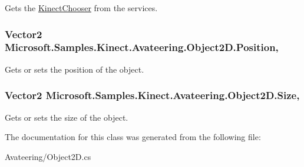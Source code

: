 Gets the \hyperlink{class_microsoft_1_1_samples_1_1_kinect_1_1_avateering_1_1_kinect_chooser}{Kinect\+Chooser} from the services. 

\hypertarget{class_microsoft_1_1_samples_1_1_kinect_1_1_avateering_1_1_object2_d_a2ed3063bbd65e30889fda66d44eaec68}{
\subsubsection[{Position}]{\setlength{\rightskip}{0pt plus 5cm}Vector2 Microsoft.\+Samples.\+Kinect.\+Avateering.\+Object2\+D.\+Position\hspace{0.3cm}{\ttfamily [get]}, {\ttfamily [set]}}}\label{class_microsoft_1_1_samples_1_1_kinect_1_1_avateering_1_1_object2_d_a2ed3063bbd65e30889fda66d44eaec68}


Gets or sets the position of the object. 

\hypertarget{class_microsoft_1_1_samples_1_1_kinect_1_1_avateering_1_1_object2_d_ac0f3198c3590593fe7b5d930ce1dab8b}{
\subsubsection[{Size}]{\setlength{\rightskip}{0pt plus 5cm}Vector2 Microsoft.\+Samples.\+Kinect.\+Avateering.\+Object2\+D.\+Size\hspace{0.3cm}{\ttfamily [get]}, {\ttfamily [set]}}}\label{class_microsoft_1_1_samples_1_1_kinect_1_1_avateering_1_1_object2_d_ac0f3198c3590593fe7b5d930ce1dab8b}


Gets or sets the size of the object. 



The documentation for this class was generated from the following file\+:\begin{DoxyCompactItemize}
\item 
Avateering/Object2\+D.\+cs\end{DoxyCompactItemize}
